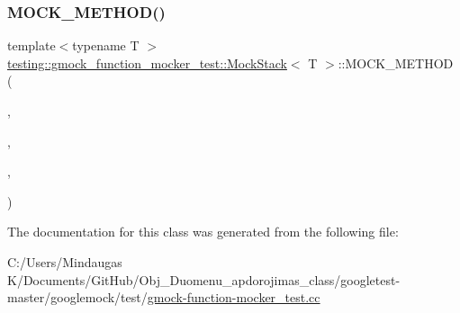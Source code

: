 \mbox{\label{classtesting_1_1gmock__function__mocker__test_1_1_mock_stack_acecb9a897885e7847da425933c9cbc1d}} 
\subsubsection{\texorpdfstring{MOCK\_METHOD()}{MOCK\_METHOD()}\hspace{0.1cm}{\footnotesize\ttfamily [12/12]}}
{\footnotesize\ttfamily template$<$typename T $>$ \\
\mbox{\hyperlink{classtesting_1_1gmock__function__mocker__test_1_1_mock_stack}{testing\+::gmock\+\_\+function\+\_\+mocker\+\_\+test\+::\+Mock\+Stack}}$<$ T $>$\+::M\+O\+C\+K\+\_\+\+M\+E\+T\+H\+OD (\begin{DoxyParamCaption}\item[{(std\+::map$<$ int, int $>$)}]{,  }\item[{Return\+Type\+With\+Comma}]{,  }\item[{(int)}]{,  }\item[{(const)}]{ }\end{DoxyParamCaption})}



The documentation for this class was generated from the following file\+:\begin{DoxyCompactItemize}
\item 
C\+:/\+Users/\+Mindaugas K/\+Documents/\+Git\+Hub/\+Obj\+\_\+\+Duomenu\+\_\+apdorojimas\+\_\+class/googletest-\/master/googlemock/test/\mbox{\hyperlink{googletest-master_2googlemock_2test_2gmock-function-mocker__test_8cc}{gmock-\/function-\/mocker\+\_\+test.\+cc}}\end{DoxyCompactItemize}
